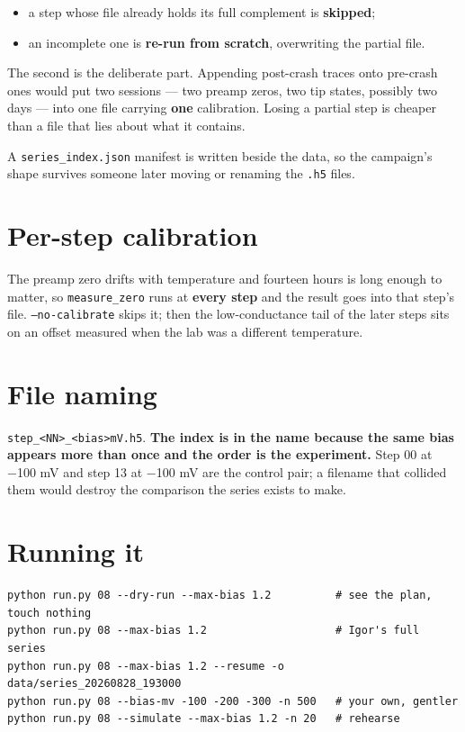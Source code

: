 \begin{itemize}[leftmargin=*]
\item a step whose file already holds its full complement is \textbf{skipped};
\item an incomplete one is \textbf{re-run from scratch}, overwriting the partial file.
\end{itemize}

The second is the deliberate part. Appending post-crash traces onto pre-crash ones would put two sessions --- two preamp zeros, two tip states, possibly two days --- into one file carrying \textbf{one} calibration. Losing a partial step is cheaper than a file that lies about what it contains.

A \texttt{series\_\discretionary{}{}{}index.\discretionary{}{}{}json} manifest is written beside the data, so the campaign's shape survives someone later moving or renaming the \texttt{.\discretionary{}{}{}h5} files.

\section{Per-step calibration}

The preamp zero drifts with temperature and fourteen hours is long enough to matter, so \texttt{measure\_\discretionary{}{}{}zero} runs at \textbf{every step} and the result goes into that step's file. \texttt{--no-calibrate} skips it; then the low-conductance tail of the later steps sits on an offset measured when the lab was a different temperature.

\section{File naming}

\texttt{step\_\discretionary{}{}{}<NN>\_\discretionary{}{}{}<bias>m\discretionary{}{}{}V.\discretionary{}{}{}h5}. \textbf{The index is in the name because the same bias appears more than once and the order is the experiment.} Step 00 at −100 mV and step 13 at −100 mV are the control pair; a filename that collided them would destroy the comparison the series exists to make.

\section{Running it}

\begin{lstlisting}[style=out]
python run.py 08 --dry-run --max-bias 1.2          # see the plan, touch nothing
python run.py 08 --max-bias 1.2                    # Igor's full series
python run.py 08 --max-bias 1.2 --resume -o data/series_20260828_193000
python run.py 08 --bias-mv -100 -200 -300 -n 500   # your own, gentler
python run.py 08 --simulate --max-bias 1.2 -n 20   # rehearse
\end{lstlisting}

